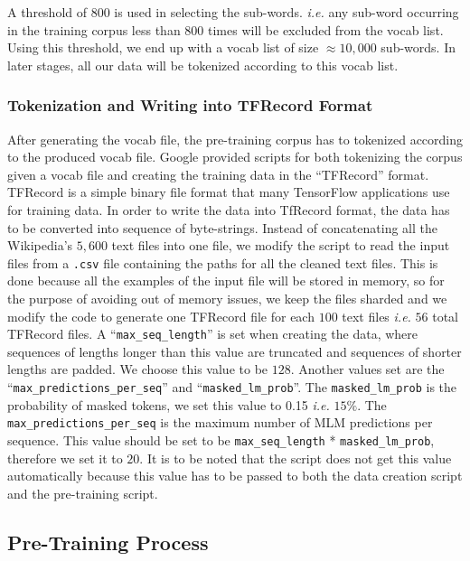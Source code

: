 A threshold of 800 is used in selecting the sub-words. \textit{i.e.} any sub-word occurring in the training corpus less than 800 times will be excluded from the vocab list. Using this threshold, we end up with a vocab list of size	$\approx 10,000$ sub-words. In later stages, all our data will be tokenized according to this vocab list.


\subsubsection{Tokenization and Writing into TFRecord Format}
\label{meth:s5_sub3_subsub3}

After generating the vocab file, the pre-training corpus has to tokenized according to the produced vocab file. Google provided scripts for both tokenizing the corpus given a vocab file and creating the training data in the \enquote{TFRecord} format. TFRecord is a simple binary file format that many TensorFlow applications use for training data. In order to write the data into TfRecord format, the data has to be converted into sequence of byte-strings. Instead of concatenating all the Wikipedia's $5,600$ text files into one file, we modify the script to read the input files from a \texttt{.csv} file containing the paths for all the cleaned text files. This is done because all the examples of the input file will be stored in memory, so for the purpose of avoiding out of memory issues, we keep the files sharded and we modify the code to generate one TFRecord file for each $100$ text files \textit{i.e.} $56$ total TFRecord files. 
A \enquote{\texttt{max\_seq\_length}} 
is set when creating the data, where sequences of lengths longer than this value are truncated and sequences of shorter lengths are padded. We choose this value to be $128$. Another values set are the \enquote{\texttt{max\_predictions\_per\_seq}} and \enquote{\texttt{masked\_lm\_prob}}. The \texttt{masked\_lm\_prob} is the probability of masked tokens, we set this value to 0.15 \textit{i.e.} $15\%$. The \texttt{max\_predictions\_per\_seq} is the maximum number of \ac{MLM} predictions per sequence. This value should be set to be \texttt{max\_seq\_length} * \texttt{masked\_lm\_prob}, therefore we set it to $20$. It is to be noted that the script does not get this value automatically because this value has to be passed to both the data creation script and the pre-training script.
 
 
\subsection{Pre-Training Process}
\label{meth:s5_sub4}

